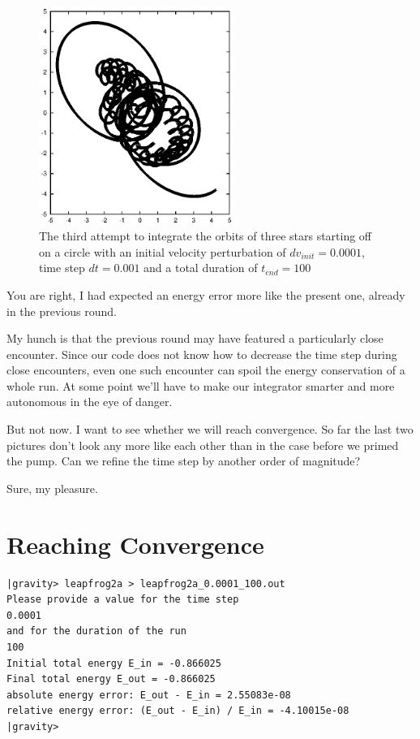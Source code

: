 \begin{figure}[htb]
\centering
\includegraphics[width=2.5in]{chap5/leapfrog2a_0.001_100.ps}
\caption[Three stars on a circle, leapfrog, $dv_{init}=0.0001$, $dt = 0.001$,
$t_{end} = 100$]
{The third attempt to integrate the orbits of three stars
starting off on a circle with an initial velocity perturbation of 
$dv_{init}=0.0001$, time step $dt = 0.001$ and a total duration of
$t_{end} = 100$}
\label{fig:leap2a-0.001-100}
\end{figure}

\abc

\bob
You are right, I had expected an energy error more like the present
one, already in the previous round.

\alice
My hunch is that the previous round may have featured a particularly
close encounter.  Since our code does not know how to decrease the
time step during close encounters, even one such encounter can spoil
the energy conservation of a whole run.  At some point we'll have to
make our integrator smarter and more autonomous in the eye of danger.

\carol
But not now.  I want to see whether we will reach convergence.  So far
the last two pictures don't look any more like each other than in the
case before we primed the pump.  Can we refine the time step by
another order of magnitude?

\alice
Sure, my pleasure.

\cba

\section{Reaching Convergence}

\begin{small}
\begin{verbatim}
|gravity> leapfrog2a > leapfrog2a_0.0001_100.out
Please provide a value for the time step
0.0001
and for the duration of the run
100
Initial total energy E_in = -0.866025
Final total energy E_out = -0.866025
absolute energy error: E_out - E_in = 2.55083e-08
relative energy error: (E_out - E_in) / E_in = -4.10015e-08
|gravity>
\end{verbatim}
\end{small}

